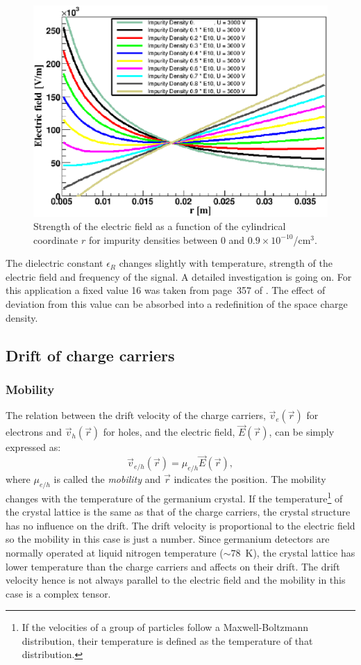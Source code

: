 \documentclass[epj,referee]{svjour}
\begin{document}
\begin{figure}[htbp]
\centering
\includegraphics[width=\linewidth]{rho} 
\caption{Strength of the electric field as a function of the
cylindrical coordinate $r$ for impurity densities between 0 and $0.9
\times 10^{-10}$/cm$^{3}$.}
\label{f:rho} 
\end{figure}

The dielectric constant $\epsilon_{R}$ changes slightly with
temperature, strength of the electric field and frequency of the
signal. A detailed investigation is going on. For this application a
fixed value 16 was taken from page~357 of \cite{Kno99}. The effect of
deviation from this value can be absorbed into a redefinition of the
space charge density.

\subsection{Drift of charge carriers} 
\label{s:drift} 
\subsubsection{Mobility} 
\label{s:mobi} 
The relation between the drift velocity of the charge carriers,
$\vec{v}_{e}(\vec{r})$ for electrons and $\vec{v}_{h}(\vec{r})$ for
holes, and the electric field, $\vec{E}(\vec{r})$, can be simply
expressed as:
\begin{equation} 
\label{e:dv}
\vec{v}_{e/h} (\vec{r})= \mu_{e/h} \vec{E}(\vec{r}),
\end{equation}
where $\mu_{e/h}$ is called the \emph{mobility} and $\vec{r}$
indicates the position. The mobility changes with the temperature of
the germanium crystal. If the temperature\footnote{If the velocities
of a group of particles follow a Maxwell-Boltzmann distribution, their
temperature is defined as the temperature of that distribution.} of
the crystal lattice is the same as that of the charge carriers, the
crystal structure has no influence on the drift. The drift velocity is
proportional to the electric field so the mobility in this case is
just a number. Since germanium detectors are normally operated at
liquid nitrogen temperature ($\sim78$~K), the crystal lattice has
lower temperature than the charge carriers and affects on their
drift. The drift velocity hence is not always parallel to the electric
field and the mobility in this case is a complex tensor.
\end{document}
